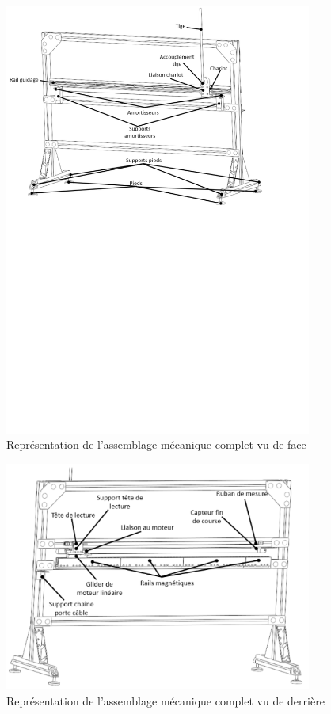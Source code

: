 \begin{figure}[H]
  \centering
  \includegraphics[width = 0.9\textwidth]{assets/figures/AssemblageCompletFace.svg}
  \caption{Représentation de l'assemblage mécanique complet vu de face}
  \label{fig:AssCompFace}
\end{figure}

\begin{figure}[H]
  \centering
  \includegraphics[width = 0.9\textwidth]{assets/figures/AssemblageCompletDerriere.svg}
  \caption{Représentation de l'assemblage mécanique complet vu de derrière}
  \label{fig:AssCompDerriere}
\end{figure}